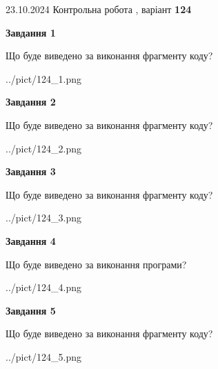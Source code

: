 \documentclass[12pt, ukrainian]{article}
\begin{document}
{\Large{23.10.2024 Контрольна робота , варіант  \No \textbf { 124 }\par}}
{
\begin {large}
{\begin {center}\textbf{Завдання 1}\end {center}}

Що буде виведено за виконання фрагменту коду?\par
\begin{center}
	{../pict/124_1.png}
\end{center}
\newpage

{\begin {center}\textbf{Завдання 2}\end {center}}

Що буде виведено за виконання фрагменту коду?\par
\begin{center}
	{../pict/124_2.png}
\end{center}
\newpage

{\begin {center}\textbf{Завдання 3}\end {center}}

Що буде виведено за виконання фрагменту коду?\par
\begin{center}
	{../pict/124_3.png}
\end{center}
\newpage

{\begin {center}\textbf{Завдання 4}\end {center}}

Що буде виведено за виконання програми?\par
\begin{center}
	{../pict/124_4.png}
\end{center}
\newpage

{\begin {center}\textbf{Завдання 5}\end {center}}

Що буде виведено за виконання фрагменту коду?\par
\begin{center}
	{../pict/124_5.png}
\end{center}
\newpage


\end{large}}
\end{document}
